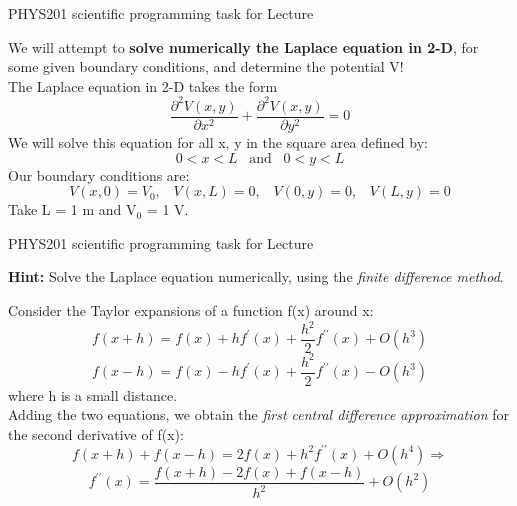 {
\programmingslide

%
%
%

\begin{frame}{PHYS201 scientific programming task for Lecture \thislecture}

{\small

We will attempt to {\bf solve numerically the Laplace equation in 2-D},
for some given boundary conditions, and determine the potential V!\\
\vspace{0.2cm}
The Laplace equation in 2-D takes the form
\begin{equation*}
  \frac{\partial^2 V(x,y)}{\partial x^2} +
  \frac{\partial^2 V(x,y)}{\partial y^2} = 0
\end{equation*}
\vspace{0.2cm}
We will solve this equation for all x, y in the square area defined by:
\begin{equation*}
    0 < x < L \;\;\; \text{and} \;\;\; 0 < y < L
\end{equation*}
\vspace{0.2cm}
Our boundary conditions are:
\begin{equation*}
    V(x,0) = V_0, \;\;\; V(x,L) = 0,  \;\;\; V(0,y) = 0,  \;\;\; V(L,y) = 0
\end{equation*}
Take L = 1 m and V$_0$ = 1 V.
}
\end{frame}

%
%
%

\begin{frame}{PHYS201 scientific programming task for Lecture \thislecture}

{\small

{\bf \color{red}Hint:} Solve the Laplace equation numerically,
using the {\em finite difference method}.

Consider the Taylor expansions of a function f(x) around x:
\begin{equation*}
   f(x+h) = f(x) + h f^{\prime}(x) + \frac{h^2}{2} f^{\prime \prime}(x) + O(h^3)
\end{equation*}
\begin{equation*}
   f(x-h) = f(x) - h f^{\prime}(x) + \frac{h^2}{2} f^{\prime \prime}(x) - O(h^3)
\end{equation*}
where h is a small distance.\\
\vspace{0.2cm}
Adding the two equations, we obtain the
{\em first central difference approximation} for the second derivative of f(x):
\begin{equation*}
   f(x+h) + f(x-h) = 2f(x) + h^2 f^{\prime \prime}(x) + O(h^4) \Rightarrow
\end{equation*}
\begin{equation*}
   f^{\prime \prime}(x) = \frac{f(x+h) - 2f(x) + f(x-h)}{h^2} + O(h^2)
\end{equation*}
}
\end{frame}

}
